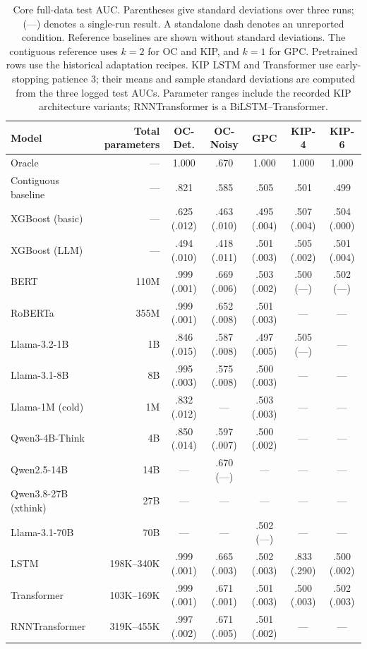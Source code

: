 \begin{table}[htbp]
\centering\small
\caption{Core full-data test AUC. Parentheses give standard deviations
over three runs; (---) denotes a single-run result. A standalone dash
denotes an unreported condition. Reference baselines are shown without
standard deviations. The contiguous reference uses $k=2$ for OC and KIP,
and $k=1$ for GPC. Pretrained rows use the historical adaptation recipes.
KIP LSTM and Transformer use early-stopping patience 3; their means and
sample standard deviations are computed from the three logged test AUCs.
Parameter ranges include the recorded KIP architecture variants;
RNNTransformer is a BiLSTM--Transformer.}
\label{tab:results_full}\label{tab:models}
\begin{tabular}{@{}lrccccc@{}}
\toprule
Model & Total parameters & OC-Det. & OC-Noisy & GPC & KIP-4 & KIP-6\\
\midrule
Oracle & --- & 1.000 & .670 & 1.000 & 1.000 & 1.000\\
Contiguous baseline & --- & .821 & .585 & .505 & .501 & .499\\
XGBoost (basic) & --- & .625 (.012) & .463 (.010) & .495 (.004) & .507 (.004) & .504 (.000)\\
XGBoost (LLM) & --- & .494 (.010) & .418 (.011) & .501 (.003) & .505 (.002) & .501 (.004)\\
BERT & 110M & .999 (.001) & .669 (.006) & .503 (.002) & .500 (---) & .502 (---)\\
RoBERTa & 355M & .999 (.001) & .652 (.008) & .501 (.003) & --- & ---\\
Llama-3.2-1B & 1B & .846 (.015) & .587 (.008) & .497 (.005) & .505 (---) & ---\\
Llama-3.1-8B & 8B & .995 (.003) & .575 (.008) & .500 (.003) & --- & ---\\
Llama-1M (cold) & 1M & .832 (.012) & --- & .503 (.003) & --- & ---\\
Qwen3-4B-Think & 4B & .850 (.014) & .597 (.007) & .500 (.002) & --- & ---\\
Qwen2.5-14B & 14B & --- & .670 (---) & --- & --- & ---\\
Qwen3.8-27B (xthink) & 27B & --- & --- & --- & --- & ---\\
Llama-3.1-70B & 70B & --- & --- & .502 (---) & --- & ---\\
LSTM & 198K--340K & .999 (.001) & .665 (.003) & .502 (.003) & .833 (.290) & .500 (.002)\\
Transformer & 103K--169K & .999 (.001) & .671 (.001) & .501 (.003) & .500 (.003) & .502 (.003)\\
RNNTransformer & 319K--455K & .997 (.002) & .671 (.005) & .501 (.002) & --- & ---\\
\bottomrule
\end{tabular}
\end{table}

